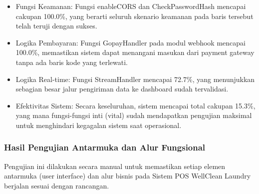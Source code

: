 \begin{itemize}
    \item Fungsi Keamanan: Fungsi enableCORS dan CheckPasswordHash mencapai cakupan 100.0\%, yang berarti seluruh skenario keamanan pada baris tersebut telah teruji dengan sukses.
    \item Logika Pembayaran: Fungsi GopayHandler pada modul webhook mencapai 100.0\%, memastikan sistem dapat menangani masukan dari payment gateway tanpa ada baris kode yang terlewati.
    \item Logika Real-time: Fungsi StreamHandler mencapai 72.7\%, yang menunjukkan sebagian besar jalur pengiriman data ke dashboard sudah tervalidasi.
    \item Efektivitas Sistem: Secara keseluruhan, sistem mencapai total cakupan 15.3\%, yang mana fungsi-fungsi inti (vital) sudah mendapatkan pengujian maksimal untuk menghindari kegagalan sistem saat operasional.
\end{itemize}

\subsubsection{Hasil Pengujian Antarmuka dan Alur Fungsional}
\indent
Pengujian ini dilakukan secara manual untuk memastikan setiap elemen antarmuka (user interface) dan alur bisnis pada Sistem POS WellClean Laundry berjalan sesuai dengan rancangan.


